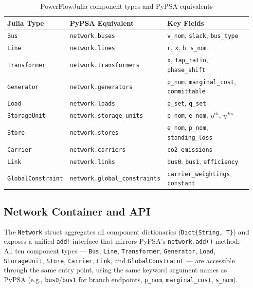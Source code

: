 \begin{table}[H]
\centering
\caption{PowerFlowJulia component types and PyPSA equivalents}
\label{tab:components}
\begin{tabular}{lll}
\toprule
\textbf{Julia Type} & \textbf{PyPSA Equivalent} & \textbf{Key Fields} \\
\midrule
\texttt{Bus}              & \texttt{network.buses}             & \texttt{v\_nom}, \texttt{slack}, \texttt{bus\_type} \\
\texttt{Line}             & \texttt{network.lines}             & \texttt{r}, \texttt{x}, \texttt{b}, \texttt{s\_nom} \\
\texttt{Transformer}      & \texttt{network.transformers}      & \texttt{x}, \texttt{tap\_ratio}, \texttt{phase\_shift} \\
\texttt{Generator}        & \texttt{network.generators}       & \texttt{p\_nom}, \texttt{marginal\_cost}, \texttt{committable} \\
\texttt{Load}             & \texttt{network.loads}            & \texttt{p\_set}, \texttt{q\_set} \\
\texttt{StorageUnit}      & \texttt{network.storage\_units}   & \texttt{p\_nom}, \texttt{e\_nom}, $\eta^{ch}$, $\eta^{dis}$ \\
\texttt{Store}            & \texttt{network.stores}           & \texttt{e\_nom}, \texttt{p\_nom}, \texttt{standing\_loss} \\
\texttt{Carrier}          & \texttt{network.carriers}         & \texttt{co2\_emissions} \\
\texttt{Link}             & \texttt{network.links}            & \texttt{bus0}, \texttt{bus1}, \texttt{efficiency} \\
\texttt{GlobalConstraint} & \texttt{network.global\_constraints} & \texttt{carrier\_weightings}, \texttt{constant} \\
\bottomrule
\end{tabular}
\end{table}

\subsection{Network Container and API}

The \texttt{Network} struct aggregates all component dictionaries (\texttt{Dict\{String,~T\}}) and exposes a unified \texttt{add!} interface that mirrors PyPSA's \texttt{network.add()} method. All ten component types --- \texttt{Bus}, \texttt{Line}, \texttt{Transformer}, \texttt{Generator}, \texttt{Load}, \texttt{StorageUnit}, \texttt{Store}, \texttt{Carrier}, \texttt{Link}, and \texttt{GlobalConstraint} --- are accessible through the same entry point, using the same keyword argument names as PyPSA (e.g., \texttt{bus0}/\texttt{bus1} for branch endpoints, \texttt{p\_nom}, \texttt{marginal\_cost}, \texttt{s\_nom}).


